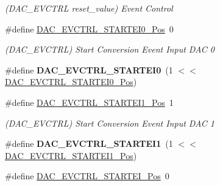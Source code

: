 \begin{DoxyCompactItemize}
\begin{DoxyCompactList}\small\item\em (D\+A\+C\+\_\+\+E\+V\+C\+T\+R\+L reset\+\_\+value) Event Control \end{DoxyCompactList}\item 
\hypertarget{group___s_a_m_l21___d_a_c_ga307b56241053d43fae08abd64c6b0f58}{}\#define \hyperlink{group___s_a_m_l21___d_a_c_ga307b56241053d43fae08abd64c6b0f58}{D\+A\+C\+\_\+\+E\+V\+C\+T\+R\+L\+\_\+\+S\+T\+A\+R\+T\+E\+I0\+\_\+\+Pos}~0\label{group___s_a_m_l21___d_a_c_ga307b56241053d43fae08abd64c6b0f58}

\begin{DoxyCompactList}\small\item\em (D\+A\+C\+\_\+\+E\+V\+C\+T\+R\+L) Start Conversion Event Input D\+A\+C 0 \end{DoxyCompactList}\item 
\hypertarget{group___s_a_m_l21___d_a_c_ga7587f957948231289d39e22423e48e87}{}\#define {\bfseries D\+A\+C\+\_\+\+E\+V\+C\+T\+R\+L\+\_\+\+S\+T\+A\+R\+T\+E\+I0}~(1 $<$$<$ \hyperlink{group___s_a_m_l21___d_a_c_ga307b56241053d43fae08abd64c6b0f58}{D\+A\+C\+\_\+\+E\+V\+C\+T\+R\+L\+\_\+\+S\+T\+A\+R\+T\+E\+I0\+\_\+\+Pos})\label{group___s_a_m_l21___d_a_c_ga7587f957948231289d39e22423e48e87}

\item 
\hypertarget{group___s_a_m_l21___d_a_c_ga23961f1cee221c2823691dc06ee3ed65}{}\#define \hyperlink{group___s_a_m_l21___d_a_c_ga23961f1cee221c2823691dc06ee3ed65}{D\+A\+C\+\_\+\+E\+V\+C\+T\+R\+L\+\_\+\+S\+T\+A\+R\+T\+E\+I1\+\_\+\+Pos}~1\label{group___s_a_m_l21___d_a_c_ga23961f1cee221c2823691dc06ee3ed65}

\begin{DoxyCompactList}\small\item\em (D\+A\+C\+\_\+\+E\+V\+C\+T\+R\+L) Start Conversion Event Input D\+A\+C 1 \end{DoxyCompactList}\item 
\hypertarget{group___s_a_m_l21___d_a_c_ga3c8790c8afc9d96cbd57afe2bcfea742}{}\#define {\bfseries D\+A\+C\+\_\+\+E\+V\+C\+T\+R\+L\+\_\+\+S\+T\+A\+R\+T\+E\+I1}~(1 $<$$<$ \hyperlink{group___s_a_m_l21___d_a_c_ga23961f1cee221c2823691dc06ee3ed65}{D\+A\+C\+\_\+\+E\+V\+C\+T\+R\+L\+\_\+\+S\+T\+A\+R\+T\+E\+I1\+\_\+\+Pos})\label{group___s_a_m_l21___d_a_c_ga3c8790c8afc9d96cbd57afe2bcfea742}

\item 
\hypertarget{group___s_a_m_l21___d_a_c_ga31ff6c0f7fef665224fcf1068cd3f3fd}{}\#define \hyperlink{group___s_a_m_l21___d_a_c_ga31ff6c0f7fef665224fcf1068cd3f3fd}{D\+A\+C\+\_\+\+E\+V\+C\+T\+R\+L\+\_\+\+S\+T\+A\+R\+T\+E\+I\+\_\+\+Pos}~0\label{group___s_a_m_l21___d_a_c_ga31ff6c0f7fef665224fcf1068cd3f3fd}


\end{DoxyCompactItemize}
